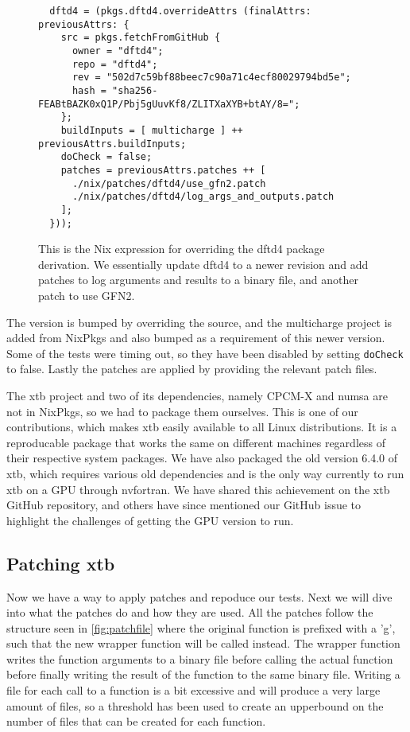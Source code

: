 \begin{figure}[H]
\begin{verbatim}
  dftd4 = (pkgs.dftd4.overrideAttrs (finalAttrs: previousAttrs: {
    src = pkgs.fetchFromGitHub {
      owner = "dftd4";
      repo = "dftd4";
      rev = "502d7c59bf88beec7c90a71c4ecf80029794bd5e";
      hash = "sha256-FEABtBAZK0xQ1P/Pbj5gUuvKf8/ZLITXaXYB+btAY/8=";
    };
    buildInputs = [ multicharge ] ++ previousAttrs.buildInputs;
    doCheck = false;
    patches = previousAttrs.patches ++ [
      ./nix/patches/dftd4/use_gfn2.patch
      ./nix/patches/dftd4/log_args_and_outputs.patch
    ];
  }));
\end{verbatim}
\caption{This is the Nix expression for overriding the dftd4 package derivation. We essentially update dftd4 to a newer revision and add patches to log arguments and results to a binary file, and another patch to use GFN2.}
\label{fig:dftf4-drv}
\end{figure}

The version is bumped by overriding the source, and the multicharge project is added from NixPkgs and also bumped as a requirement of this newer version. Some of the tests were timing out, so they have been disabled by setting \verb|doCheck| to false. Lastly the patches are applied by providing the relevant patch files.

The xtb project and two of its dependencies, namely CPCM-X and numsa are not in NixPkgs, so we had to package them ourselves. This is one of our contributions, which makes xtb easily available to all Linux distributions. It is a reproducable package that works the same on different machines regardless of their respective system packages. We have also packaged the old version 6.4.0 of xtb, which requires various old dependencies and is the only way currently to run xtb on a GPU through nvfortran. We have shared this achievement on the xtb GitHub repository, and others have since mentioned our GitHub issue to highlight the challenges of getting the GPU version to run.

\subsection{Patching xtb}

Now we have a way to apply patches and repoduce our tests. Next we will dive into what the patches do and how they are used.
All the patches follow the structure seen in \autoref{fig:patchfile} where the original function is prefixed with a 'g', such that the new wrapper function will be called instead. The wrapper function writes the function arguments to a binary file before calling the actual function before finally writing the result of the function to the same binary file.
Writing a file for each call to a function is a bit excessive and will produce a very large amount of files, so a threshold has been used to create an upperbound on the number of files that can be created for each function.


